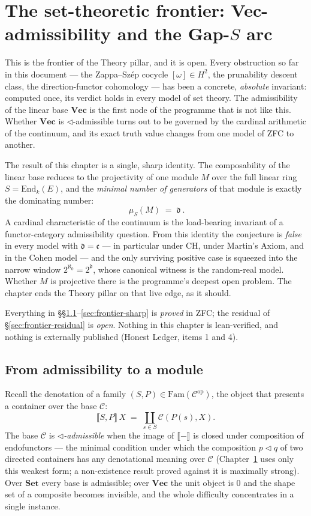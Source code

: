 \documentclass[11pt]{report}
\theoremstyle{plain}
\theoremstyle{definition}
\theoremstyle{remark}
\newcommand{\VecC}{\mathbf{Vec}}
\newcommand{\Fam}{\mathrm{Fam}}
\newcommand{\Hcoh}{H^2}
\newcommand{\dd}{\mathfrak{d}}
\newcommand{\cont}{\mathfrak{c}}
\newcommand{\End}{\mathrm{End}}
\newcommand{\tri}{\triangleleft}
\newcommand{\op}{\mathrm{op}}
\newcommand{\Set}{\mathbf{Set}}
\newcommand{\den}[1]{\llbracket #1 \rrbracket}
\begin{document}


\chapter{The set-theoretic frontier: Vec-admissibility and the Gap-\texorpdfstring{$S$}{S} arc}
\label{ch:frontier}

This is the frontier of the Theory pillar, and it is open. Every obstruction so
far in this document --- the Zappa--Sz\'ep cocycle $[\omega]\in\Hcoh$, the
prunability descent class, the direction-functor cohomology --- has been a
concrete, \emph{absolute} invariant: computed once, its verdict holds in every
model of set theory. The admissibility of the linear base $\VecC$ is the first
node of the programme that is not like this. Whether $\VecC$ is
$\tri$-admissible turns out to be governed by the cardinal arithmetic of the
continuum, and its exact truth value changes from one model of ZFC to another.

The result of this chapter is a single, sharp identity. The composability of the
linear base reduces to the projectivity of one module $M$ over the full linear
ring $S=\End_k(E)$, and the \emph{minimal number of generators} of that module
is exactly the dominating number:
\[
   \boxed{\ \mu_S(M) \;=\; \dd\ }.
\]
A cardinal characteristic of the continuum is the load-bearing invariant of a
functor-category admissibility question. From this identity the conjecture is
\emph{false} in every model with $\dd=\cont$ --- in particular under $\mathrm{CH}$,
under Martin's Axiom, and in the Cohen model --- and the only surviving positive
case is squeezed into the narrow window $2^{\aleph_0}=2^{\dd}$, whose canonical
witness is the random-real model. Whether $M$ is projective there is the
programme's deepest open problem. The chapter ends the Theory pillar on that live
edge, as it should.

Everything in \S\S\ref{sec:frontier-reduction}--\ref{sec:frontier-sharp} is
\emph{proved} in ZFC; the residual of \S\ref{sec:frontier-residual} is
\emph{open}. Nothing in this chapter is lean-verified, and nothing is externally
published (Honest Ledger, items 1 and 4).

\section{From admissibility to a module}\label{sec:frontier-reduction}

Recall the denotation of a family $(S,P)\in\Fam(\mathcal C^{\op})$, the object
that presents a container over the base $\mathcal C$:
\[
   \den{S,P}\,X \;=\; \coprod_{s\in S}\mathcal C(P(s),X).
\]
The base $\mathcal C$ is \emph{$\tri$-admissible} when the image of $\den{-}$ is
closed under composition of endofunctors --- the minimal condition under which
the composition $p\tri q$ of two directed containers has any denotational
meaning over $\mathcal C$ (Chapter~\ref{ch:frontier} uses only this weakest
form; a non-existence result proved against it is maximally strong). Over
$\Set$ every base is admissible; over $\VecC$ the unit object is $0$ and the
shape set of a composite becomes invisible, and the whole difficulty
concentrates in a single instance.
\end{document}
